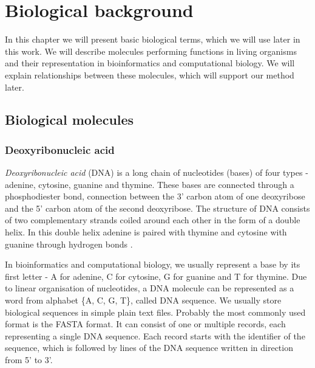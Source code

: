 \chapter{Biological background}
In this chapter we will present basic biological terms, which we will use later in this work.
We will describe molecules performing functions in living organisms and their representation in bioinformatics and computational biology.
We will explain relationships between these molecules, which will support our method later.

\section{Biological molecules}

\subsection{Deoxyribonucleic acid}
\emph{Deoxyribonucleic acid} (DNA) is a long chain of nucleotides (bases) of four types - adenine, cytosine, guanine and thymine.
These bases are connected through a phosphodiester bond, connection between the 3' carbon atom of one deoxyribose and the 5' carbon atom of the second deoxyribose.
The structure of DNA consists of two complementary strands coiled around each other in the form of a double helix.
In this double helix adenine is paired with thymine and cytosine with guanine through hydrogen bonds \cite{}.

In bioinformatics and computational biology, we usually represent a base by its first letter - A for adenine, C for cytosine, G for guanine and T for thymine.
Due to linear organisation of nucleotides, a DNA molecule can be represented as a word from alphabet \{A, C, G, T\}, called DNA sequence. We usually store biological sequences in simple plain text files.
Probably the most commonly used format is the FASTA format.
It can consist of one or multiple records, each representing a single DNA sequence.
Each record starts with the identifier of the sequence, which is followed by lines of the DNA sequence written in direction from 5' to 3'.

